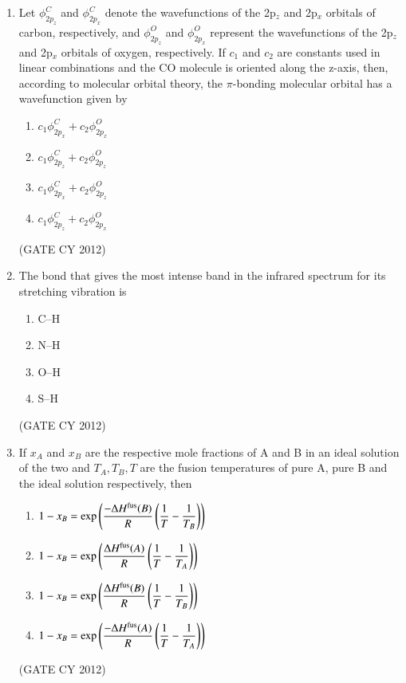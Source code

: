 \documentclass[12pt]{article}
\begin{document}
\begin{enumerate}
\item Let $\phi_{2p_z}^C$ and $\phi_{2p_x}^C$ denote the wavefunctions of the 2p$_z$ and 2p$_x$ orbitals of carbon, respectively, and $\phi_{2p_z}^O$ and $\phi_{2p_x}^O$ represent the wavefunctions of the 2p$_z$ and 2p$_x$ orbitals of oxygen, respectively. If $c_1$ and $c_2$ are constants used in linear combinations and the CO molecule is oriented along the z-axis, then, according to molecular orbital theory, the $\pi$-bonding molecular orbital has a wavefunction given by  
\begin{multicols}{2}
\begin{enumerate}
    \item $c_1 \phi_{2p_x}^C + c_2 \phi_{2p_x}^O$
    \item $c_1 \phi_{2p_z}^C + c_2 \phi_{2p_z}^O$
    \item $c_1 \phi_{2p_x}^C + c_2 \phi_{2p_z}^O$
    \item $c_1 \phi_{2p_z}^C + c_2 \phi_{2p_x}^O$
\end{enumerate}
\end{multicols}
\hfill (GATE CY 2012)

\item The bond that gives the most intense band in the infrared spectrum for its stretching vibration is  
\begin{multicols}{2}
\begin{enumerate}
    \item C–H
    \item N–H
    \item O–H
    \item S–H
\end{enumerate}
\end{multicols}
\hfill (GATE CY 2012)

\item If $x_A$ and $x_B$ are the respective mole fractions of A and B in an ideal solution of the two and $T_A, T_B, T$ are the fusion temperatures of pure A, pure B and the ideal solution respectively, then  

\begin{multicols}{2}
\begin{enumerate}
    \item $1 - x_B = \exp \left( \dfrac{-\Delta H^{\text{fus}}(B)}{R} \left( \dfrac{1}{T} - \dfrac{1}{T_B} \right) \right)$
    \item $1 - x_B = \exp \left( \dfrac{\Delta H^{\text{fus}}(A)}{R} \left( \dfrac{1}{T} - \dfrac{1}{T_A} \right) \right)$
    \item $1 - x_B = \exp \left( \dfrac{\Delta H^{\text{fus}}(B)}{R} \left( \dfrac{1}{T} - \dfrac{1}{T_B} \right) \right)$
    \item $1 - x_B = \exp \left( \dfrac{-\Delta H^{\text{fus}}(A)}{R} \left( \dfrac{1}{T} - \dfrac{1}{T_A} \right) \right)$
\end{enumerate}
\end{multicols}
\hfill (GATE CY 2012)


\end{enumerate}
\end{document}
